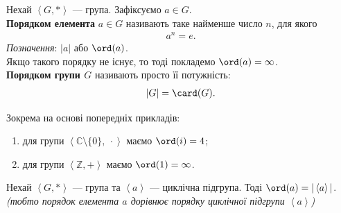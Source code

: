 \documentclass{math_library}
\begin{document}
\begin{definition}
Нехай $\left<G,* \right>$ --- група. Зафіксуємо $a \in G$.\\
\textbf{Порядком елемента} $a \in G$ називають таке найменше число $n$, для якого
\begin{align*}
a^n = e.
\end{align*}
\textit{Позначення}: $|a|$ або $\ord (a)$. \\
Якщо такого порядку не існує, то тоді покладемо $\ord (a) = \infty$.\\
\textbf{Порядком групи $G$} називають просто її потужність:
\begin{align*}
|G| = \card(G).
\end{align*}
\end{definition}

\begin{example}
Зокрема на основі попередніх прикладів:
\begin{enumerate}[nosep,wide=0pt,label={\arabic*)}]
\item для групи $\left< \mathbb{C} \setminus \{0\},\ \cdot \right>$ маємо $\ord(i) = 4$;
\item для групи $\left< \mathbb{Z},+\right>$ маємо $\ord(1) = \infty$.
\end{enumerate}
\end{example}

\begin{proposition}
\label{order_of_a_group_is_the_order_of_a_cyclic_subgroup}
Нехай $\left<G,* \right>$ --- група та $\left<a\right>$ --- циклічна підгрупа. Тоді $\ord (a) = |\left<a\right>|$. \\ \textit{(тобто порядок елемента $a$ дорівнює порядку циклічної підгрупи $\left<a\right>$)}
\end{proposition}
\end{document}

